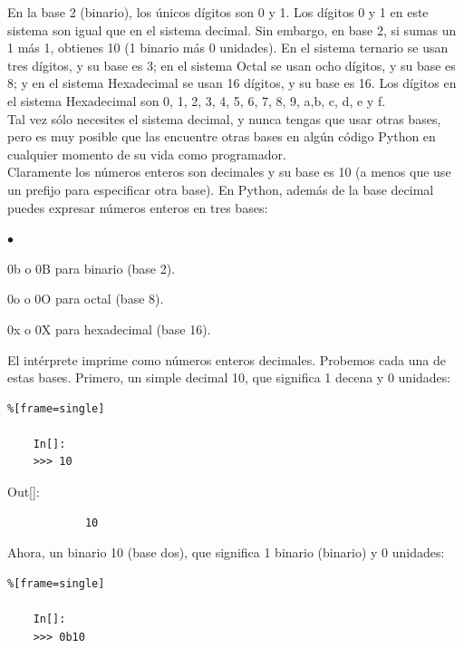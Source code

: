 En la base 2 (binario), los únicos dígitos son 0 y 1. Los dígitos 0 y 1 en este sistema son igual que en el sistema decimal. Sin embargo, en base 2, si sumas un 1 más  1, obtienes 10  (1 binario  más 0 unidades). En el sistema ternario se usan tres dígitos, y su base es 3;  en el sistema Octal se usan ocho dígitos, y su base es  8; y en el sistema Hexadecimal se usan 16 dígitos, y su  base es 16. Los dígitos en el sistema Hexadecimal son  0, 1, 2, 3, 4, 5, 6, 7, 8, 9, a,b, c, d, e y f.  \\ 


Tal vez sólo necesites el sistema decimal, y nunca tengas que usar  otras bases, pero es muy posible que las encuentre otras bases en algún código Python en cualquier momento de su vida como programador. \\

Claramente los números enteros son decimales y su base es 10 (a menos que use un prefijo para especificar otra
base). En Python, además de la base  decimal puedes expresar números enteros en tres bases:

\begin{list}{$\bullet$}{}  
	
	\item {\ttfamily 0b o 0B} para binario (base 2).
	\item {\ttfamily 0o o 0O} para octal (base 8).
	\item {\ttfamily 0x o 0X} para hexadecimal (base 16).
\end{list}


El intérprete  imprime como números enteros decimales. Probemos cada una de estas bases.
Primero, un simple decimal 10, que significa 1 decena y 0 unidades:

\begin{lstlisting}%[frame=single]
	
	In[]:
	>>> 10	
\end{lstlisting}

{\ttfamily\scriptsize\scriptsize 
	\hspace{-0.65cm}Out[]:\vspace{-0.15cm}	
	{\color{blue} 	
		\begin{verbatim}
			10
		\end{verbatim}
}}

Ahora, un binario 10 (base dos), que significa 1 binario (binario) y 0 unidades:

\begin{lstlisting}%[frame=single]
	
	In[]:
	>>> 0b10	
\end{lstlisting}\label{CeroB}

